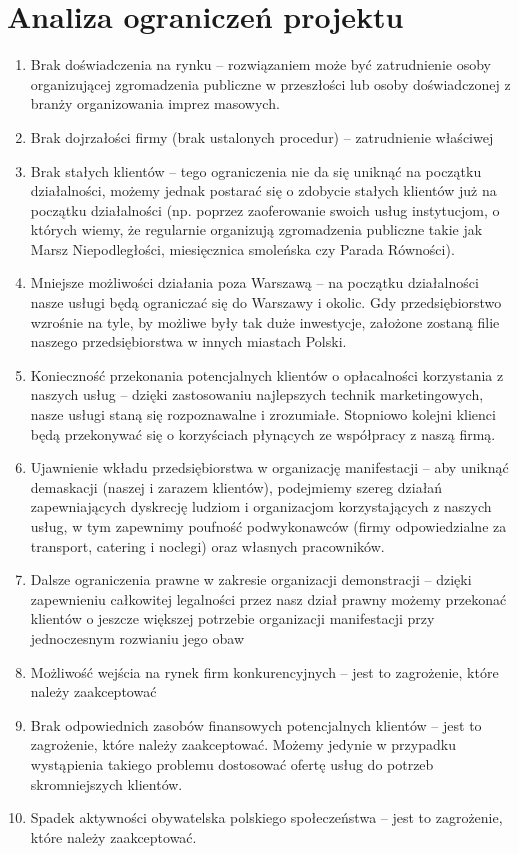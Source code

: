 \documentclass{article}
\begin{document}
\section{Analiza ograniczeń projektu}
\begin{enumerate}
\item Brak doświadczenia na rynku -- rozwiązaniem może być zatrudnienie osoby organizującej zgromadzenia publiczne w przeszłości lub osoby doświadczonej z branży organizowania imprez masowych.
\item Brak dojrzałości firmy (brak ustalonych procedur) -- zatrudnienie właściwej 
\item Brak stałych klientów -- tego ograniczenia nie da się uniknąć na początku działalności, możemy jednak postarać się o zdobycie stałych klientów już na początku działalności (np. poprzez zaoferowanie swoich usług instytucjom, o których wiemy, że regularnie organizują zgromadzenia publiczne takie jak Marsz Niepodległości, miesięcznica smoleńska czy Parada Równości).
\item Mniejsze możliwości działania poza Warszawą -- na początku działalności nasze usługi będą ograniczać się do Warszawy i okolic. Gdy przedsiębiorstwo wzrośnie na tyle, by możliwe były tak duże inwestycje, założone zostaną filie naszego przedsiębiorstwa w innych miastach Polski.
\item Konieczność przekonania potencjalnych klientów o opłacalności korzystania z naszych usług -- dzięki zastosowaniu najlepszych technik marketingowych, nasze usługi staną się rozpoznawalne i zrozumiałe. Stopniowo kolejni klienci będą przekonywać się o korzyściach płynących ze współpracy z naszą firmą.
\item Ujawnienie wkładu przedsiębiorstwa w organizację manifestacji -- aby uniknąć demaskacji (naszej i zarazem klientów), podejmiemy szereg działań zapewniających dyskrecję ludziom i organizacjom korzystających z naszych usług, w tym zapewnimy poufność podwykonawców (firmy odpowiedzialne za transport, catering i noclegi) oraz własnych pracowników.
\item Dalsze ograniczenia prawne w zakresie organizacji demonstracji -- dzięki zapewnieniu całkowitej legalności przez nasz dział prawny możemy przekonać klientów o jeszcze większej potrzebie organizacji manifestacji przy jednoczesnym rozwianiu jego obaw
\item Możliwość wejścia na rynek firm konkurencyjnych -- jest to zagrożenie, które należy zaakceptować
\item Brak odpowiednich zasobów finansowych potencjalnych klientów -- jest to zagrożenie, które należy zaakceptować. Możemy jedynie w przypadku wystąpienia takiego problemu dostosować ofertę usług do potrzeb skromniejszych klientów.
\item Spadek aktywności obywatelska polskiego społeczeństwa -- jest to zagrożenie, które należy zaakceptować.



\end{enumerate}




\end{document}
